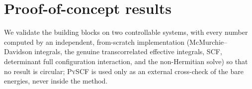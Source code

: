 \documentclass[aps,prb,reprint,superscriptaddress,floatfix]{revtex4-2}
\begin{document}
\section{Proof-of-concept results}\label{sec:results}

We validate the building blocks on two controllable systems, with every number
computed by an independent, from-scratch implementation (McMurchie--Davidson
integrals, the genuine transcorrelated effective integrals, SCF, determinant full
configuration interaction, and the non-Hermitian solve) so that no result is
circular; \textsc{PySCF} is used only as an external cross-check of the bare
energies, never inside the method.

\end{document}
